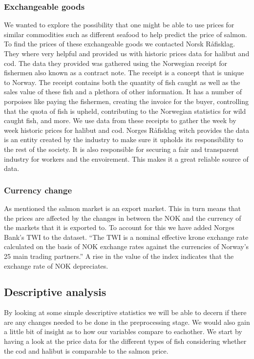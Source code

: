 \subsubsection{Exchangeable goods}\label{Exchangeable goods}
We wanted to explore the possibility that one might be able to use prices for similar commodities such as different seafood to help predict the price of salmon. To find the prices of these exchangeable goods we contacted Norsk Råfisklag. They where very helpful and provided us with historic prices data for halibut and cod. The data they provided was gathered using the Norwegian receipt for fishermen also known as a contract note. The receipt is a concept that is unique to Norway. The receipt contains both the quantity of fish caught as well as the sales value of these fish and a plethora of other information. It has a number of porpoises like paying the fishermen, creating the invoice for the buyer, controlling that the quota of fish is upheld, contributing to the Norwegian statistics for wild caught fish, and more. We use data from these receipts to gather the week by week historic prices for halibut and cod. Norges Råfisklag witch provides the data is an entity created by the industry to make sure it upholds its responsibility to the rest of the society. It is also responsible for securing a fair and transparent industry for workers and the envoirement. This makes it a great reliable source of data.\parencite{Harland_2022}

\subsubsection{Currency change}\label{Currency change}
As mentioned the salmon market is an export market. This in turn means that the prices are affected by the changes in between the NOK and the currency of the markets that it is exported to. To account for this we have added Norges Bank's TWI to the dataset. ``The TWI is a nominal effective krone exchange rate calculated on the basis of NOK exchange rates against the currencies of Norway's 25 main trading partners.'' \parencite{norges_bank_2020} A rise in the value of the index indicates that the exchange rate of NOK depreciates.

\subsection{Descriptive analysis}
By looking at some simple descriptive statistics we will be able to decern if there are any changes needed to be done in the preprocessing stage. We would also gain a little bit of insight as to how our variables compare to eachother. We start by having a look at the price data for the different types of fish considering whether the cod and halibut is comparable to the salmon price.

